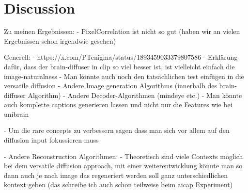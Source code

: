 \chapter{Discussion}


Zu meinen Ergebnissen:
- PixelCorrelation ist nicht so gut (haben wir an vielen Ergebnissen schon irgendwie gesehen)


Generell:
- https://x.com/PTenigma/status/1893459033379807586
- Erklärung dafür, dass der brain-diffuser in clip so viel besser ist, ist vielleicht einfach die image-naturalness
- Man könnte auch noch den tatsächlichen test einfügen in die versatile diffusion
- Andere Image generation Algorithms (innerhalb des brain-diffuser Algorithm)
- Andere Decoder-Algorithmen (mindeye etc.)
    - Man könnte auch komplette captions generieren lassen und nicht nur die Features wie bei unibrain \cite{maiUniBrainUnifyImage2023}


- Um die rare concepts zu verbessern sagen \cite{samuelGeneratingImagesRare2024} dass man sich vor allem auf den diffusion input fokussieren muss


- Andere Reconstruction Algorithmen:
    - Theoretisch sind viele Contexts möglich bei dem versatile diffusion approach, mit einer weiterentwicklung könnte man so dann auch je nach image das regeneriert werden soll ganz unterschiedlichen kontext geben (das schreibe ich auch schon teilweise beim aicap Experiment)

